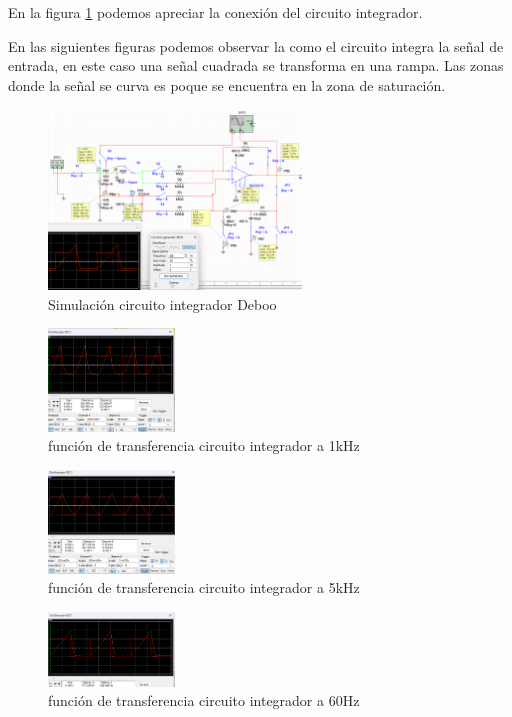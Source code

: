 En la figura \ref{fig:sim-integrador} podemos apreciar la conexión del circuito integrador.

En las siguientes figuras podemos observar la como el circuito integra la señal de entrada, en este caso una señal cuadrada se transforma en una rampa. Las zonas donde la señal se curva es poque se encuentra en la zona de saturación.

\begin{figure}[ht]
    \centering
    \includegraphics[width=0.6\textwidth]{src/images/simulaciones/integrador.png}
    \caption{Simulación circuito integrador Deboo}
    \label{fig:sim-integrador}
\end{figure}

\begin{figure}[ht]
    \centering
    \includegraphics[width=0.3\textwidth]{src/images/simulaciones/integrador-transferencia-1khz.png}
    \caption{función de transferencia circuito integrador a 1kHz}
    \label{fig:sim-integrador-1k}
\end{figure}

\begin{figure}[ht]
    \centering
    \includegraphics[width=0.3\textwidth]{src/images/simulaciones/integrador-transferencia-5kh.png}
    \caption{función de transferencia circuito integrador a 5kHz}
    \label{fig:sim-integrador-5k}
\end{figure}

\begin{figure}[ht]
    \centering
    \includegraphics[width=0.3\textwidth]{src/images/simulaciones/integrador-transferencia-60hz.png}
    \caption{función de transferencia circuito integrador a 60Hz}
    \label{fig:sim-integrador-60}
\end{figure}